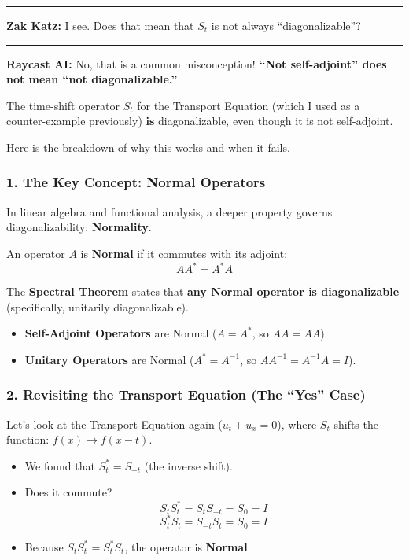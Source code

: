 \documentclass[oneside]{book}
\begin{document}
\noindent\rule{\textwidth}{0.4pt}

\noindent \textbf{Zak Katz:} I see. Does that mean that $S_t$ is not always ``diagonalizable''?

\noindent\rule{\textwidth}{0.4pt}

\noindent \textbf{Raycast AI:} No, that is a common misconception! \textbf{``Not self-adjoint'' does not mean ``not diagonalizable.''}

The time-shift operator $S_t$ for the Transport Equation (which I used as a counter-example previously) \textbf{is} diagonalizable, even though it is not self-adjoint.

Here is the breakdown of why this works and when it fails.

\subsubsection*{1. The Key Concept: Normal Operators}
In linear algebra and functional analysis, a deeper property governs diagonalizability: \textbf{Normality}.

An operator $A$ is \textbf{Normal} if it commutes with its adjoint:
\[ AA^* = A^*A \]

The \textbf{Spectral Theorem} states that \textbf{any Normal operator is diagonalizable} (specifically, unitarily diagonalizable).
\begin{itemize}
    \item \textbf{Self-Adjoint Operators} are Normal ($A = A^*$, so $A A = A A$).
    \item \textbf{Unitary Operators} are Normal ($A^* = A^{-1}$, so $A A^{-1} = A^{-1} A = I$).
\end{itemize}

\subsubsection*{2. Revisiting the Transport Equation (The ``Yes'' Case)}
Let's look at the Transport Equation again ($u_t + u_x = 0$), where $S_t$ shifts the function: $f(x) \to f(x-t)$.
\begin{itemize}
    \item We found that $S_t^* = S_{-t}$ (the inverse shift).
    \item Does it commute?
    \[ S_t S_t^* = S_t S_{-t} = S_0 = I \]
    \[ S_t^* S_t = S_{-t} S_t = S_0 = I \]
    \item Because $S_t S_t^* = S_t^* S_t$, the operator is \textbf{Normal}.
\end{itemize}
\end{document}
